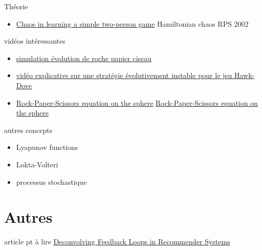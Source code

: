 \documentclass[aspectratio=169,xcolor=dvipsnames]{beamer}
\begin{document}
\begin{frame}{Théorie}
    \begin{itemize}
        \item \href{https://www.pnas.org/doi/epdf/10.1073/pnas.032086299}{\color{blue} Chaos in learning a simple two-person game} Hamiltonian chaos RPS 2002
    \end{itemize}
\end{frame}

\begin{frame}{vidéos intéressantes}

    \begin{itemize}
    \item \href{https://www.youtube.com/watch?v=tCoEYFbDVoI}{\color{blue} simulation évolution de roche papier ciseau} 
    \item \href{https://www.youtube.com/watch?v=YKB763gy3pc}{\color{blue} vidéo explicative sur une stratégie évolutivement instable pour le jeu Hawk-Dove}
    \item \href{https://youtu.be/vAOuy21n4tc?si=DvrjIaCqho_XKwWs&t=110}{\color{blue} Rock-Paper-Scissors equation on the sphere} \href{https://www.nature.com/articles/nature00823}{\color{blue} Rock-Paper-Scissors equation on the sphere}
    \end{itemize}

\end{frame}

\begin{frame}{autres concepts}
\begin{itemize}
    \item Lyapunov functions
    \item Lokta-Volteri
    \item processus stochastique
\end{itemize}
\end{frame}

\section{Autres}

\begin{frame}{article pt à lire}
    \href{https://proceedings.neurips.cc/paper/2016/file/962e56a8a0b0420d87272a682bfd1e53-Paper.pdf}{\color{blue} Deconvolving Feedback Loops
in Recommender Systems
}
\end{frame}
\end{document}
